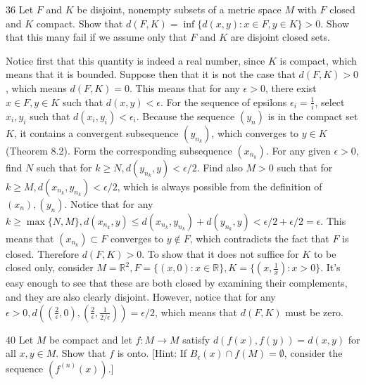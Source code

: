 \begin{exercise}{36}
    Let $F$ and $K$ be disjoint, nonempty subsets of a metric space $M$ with $F$ closed and $K$ compact.
    Show that $d(F, K) = \inf\{d(x, y): x \in F, y \in K\} > 0$.
    Show that this many fail if we assume only that $F$ and $K$ are disjoint closed sets.
\end{exercise}

\begin{solution}
    
    Notice first that this quantity is indeed a real number, since $K$ is compact, which means that it is bounded.
    Suppose then that it is not the case that $d(F, K) > 0$, which means $d(F, K) = 0$.
    This means that for any $\epsilon > 0$, there exist $x \in F, y \in K$ such that $d(x, y) < \epsilon$.
    For the sequence of epsilons $\epsilon_i = \frac{1}{i}$, select $x_i, y_i$ such that $d(x_i, y_i) < \epsilon_i$.
    Because the sequence $(y_n)$ is in the compact set $K$, it contains a convergent subsequence $(y_{n_k})$, which converges to $y \in K$ (Theorem 8.2).
    Form the corresponding subsequence $(x_{n_k})$.
    For any given $\epsilon > 0$, find $N$ such that for $k \geq N, d(y_{n_k}, y) < \epsilon/2$.
    Find also $M > 0$ such that for $k \geq M, d(x_{n_k}, y_{n_k}) < \epsilon/2$, which is always possible from the definition of $(x_n), (y_n)$.
    Notice that for any $k \geq \max\{N, M\}, d(x_{n_k}, y) \leq d(x_{n_k}, y_{n_k}) + d(y_{n_k}, y) < \epsilon/2 + \epsilon/2 = \epsilon$.
    This means that $(x_{n_k}) \subset F$ converges to $y \notin F$, which contradicts the fact that $F$ is closed.
    Therefore $d(F, K) > 0$.
    To show that it does not suffice for $K$ to be closed only, consider $M = \mathbb{R}^2, F = \{(x, 0): x \in \mathbb{R}\}, K = \{(x, \frac{1}{x}): x > 0\}$.
    It's easy enough to see that these are both closed by examining their complements, and they are also clearly disjoint.
    However, notice that for any $\epsilon > 0, d((\frac{2}{\epsilon}, 0), (\frac{2}{\epsilon}, \frac{1}{2/\epsilon})) = \epsilon/2$, which means that $d(F, K)$ must be zero.
\end{solution}

\begin{exercise}{40}
    Let $M$ be compact and let $f: M \rightarrow M$ satisfy $d(f(x), f(y)) = d(x, y)$ for all $x, y \in M$.
    Show that $f$ is onto.
    [Hint: If $B_{\epsilon}(x) \cap f(M) = \emptyset$, consider the sequence $(f^{(n)}(x))$.]
\end{exercise}

